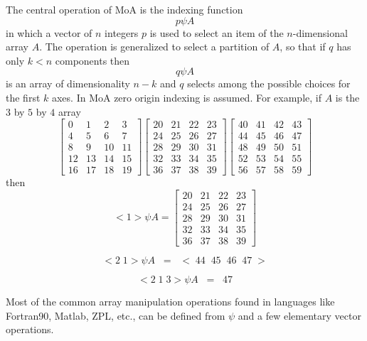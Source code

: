 The central operation of MoA is the indexing function
\[
                    p \psi A \]
in which a vector of $n$ integers $p$ is used to select an item of 
the $n$-dimensional array $A$.
The operation is generalized to select a partition of $A$, 
so that if $q$ has only $k < n $ components
then
\[                    q \psi A \]
is an array of dimensionality $n-k$ and $q$ selects among the possible 
choices for the first $k$ axes. In MoA zero origin indexing is assumed.
For example, if $A$ is the $3$ by $5$ by $4$ array
\small
\[ \left [
\begin{array}{lrrrr}
0 & 1 &  2 & 3  \\
4 & 5 & 6 & 7 \\
8 & 9 & 10 & 11  \\
12 & 13 & 14 & 15 \\
16 & 17 & 18 & 19 
\end{array} \right ] 
\left [ \begin{array}{rrrr}
20 & 21 & 22 & 23 \\
24 & 25 & 26 & 27 \\
28 & 29 & 30 & 31 \\
32 & 33 & 34 & 35 \\
36 & 37 & 38 & 39 
\end{array} \right ]
\left [ \begin{array}{rrrr}
40 & 41 & 42 & 43 \\
44 & 45 & 46 & 47 \\
48 & 49 & 50 & 51 \\
52 & 53 & 54 & 55 \\
56 & 57 & 58 & 59
\end{array} \right ] \]
\normalsize
then
\[
     <1> \psi A = \left [  \begin{array}{rrrr}
                   20 & 21 & 22 & 23 \\
                   24 & 25 & 26 & 27 \\
                   28 & 29 & 30 & 31 \\
                   32 & 33 & 34 & 35 \\
                   36 & 37 & 38 & 39 
                    \end{array} \right ] \]

\[     <2 \; 1> \psi A \; \; = \; \; < \; 44 \;\; 45 \;\; 46 \;\; 47 \; > \]

\[      <2\; 1\; 3> \psi A \; \; = \; \; 47 \]

Most of the common array manipulation operations found in languages like Fortran90, Matlab, ZPL, etc.,
 can be defined from $\psi$ and a few elementary vector operations.

